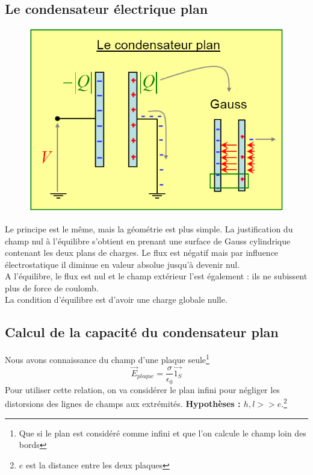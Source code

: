 \documentclass	[11pt, a4paper, openany]{book}
\begin{document}
\subsection{Le condensateur électrique plan}
\begin{figure}
\includegraphics[scale=0.24]{es/image14.png}
\end{figure}
Le principe est le même, mais la géométrie est plus simple.  La justification du champ nul à l'équilibre s'obtient en prenant une surface de Gauss cylindrique contenant les deux plans de charges. Le flux est négatif mais par influence électrostatique il diminue en valeur absolue jusqu'à devenir nul.\\
A l'équilibre, le flux est nul et le champ extérieur l'est également : ils ne subissent plus de force de coulomb.\\
La condition d'équilibre est d'avoir une charge globale nulle.

\subsection{Calcul de la capacité du condensateur plan}
Nous avons connaissance du champ d'une plaque seule\footnote{Que si le plan est considéré comme infini et que l'on calcule le champ loin des bords}
\begin{equation}
\vec{E}_{plaque} = \frac{\sigma}{\epsilon_0}\vec{1_S}
\end{equation}
Pour utiliser cette relation, on va considérer le plan infini pour négliger les distorsions des lignes de champs aux extrémités. \textbf{Hypothèses : $h, l >> e$}.\footnote{$e$ est la distance entre les deux plaques}
\end{document}
